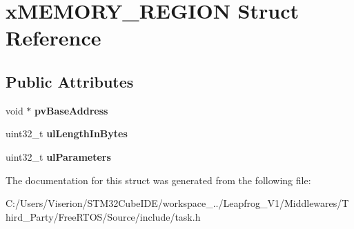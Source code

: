\hypertarget{structx_m_e_m_o_r_y___r_e_g_i_o_n}{}\section{x\+M\+E\+M\+O\+R\+Y\+\_\+\+R\+E\+G\+I\+ON Struct Reference}
\label{structx_m_e_m_o_r_y___r_e_g_i_o_n}
\subsection*{Public Attributes}
\begin{DoxyCompactItemize}
\item 
\mbox{\label{structx_m_e_m_o_r_y___r_e_g_i_o_n_a228036bbfdbc38f170e45deadb166172}} 
void $\ast$ {\bfseries pv\+Base\+Address}
\item 
\mbox{\label{structx_m_e_m_o_r_y___r_e_g_i_o_n_a97e59578d3c4c46270d33e7206258a65}} 
uint32\+\_\+t {\bfseries ul\+Length\+In\+Bytes}
\item 
\mbox{\label{structx_m_e_m_o_r_y___r_e_g_i_o_n_a6ba180553e9a318f23acc5f4664934e3}} 
uint32\+\_\+t {\bfseries ul\+Parameters}
\end{DoxyCompactItemize}


The documentation for this struct was generated from the following file\+:\begin{DoxyCompactItemize}
\item 
C\+:/\+Users/\+Viserion/\+S\+T\+M32\+Cube\+I\+D\+E/workspace\+\_../\+Leapfrog\+\_\+\+V1/\+Middlewares/\+Third\+\_\+\+Party/\+Free\+R\+T\+O\+S/\+Source/include/task.\+h\end{DoxyCompactItemize}
